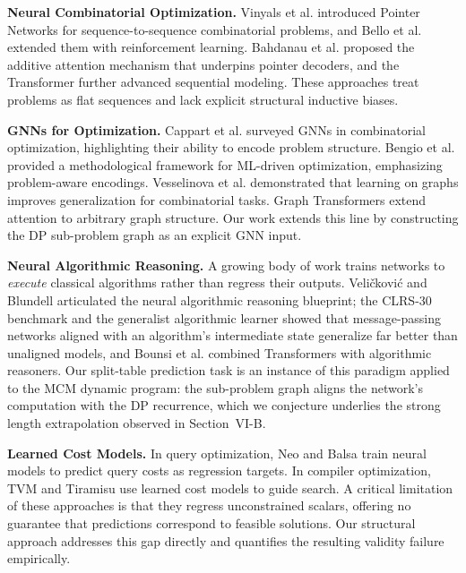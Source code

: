 \documentclass[conference]{IEEEtran}
\begin{document}
\textbf{Neural Combinatorial Optimization.} Vinyals et al. \cite{vinyals2015}
introduced Pointer Networks for sequence-to-sequence combinatorial problems,
and Bello et al. \cite{bello2017} extended them with reinforcement learning.
Bahdanau et al. \cite{bahdanau2015} proposed the additive attention mechanism
that underpins pointer decoders, and the Transformer \cite{vaswani2017} further
advanced sequential modeling. These approaches treat problems as flat sequences
and lack explicit structural inductive biases.

\textbf{GNNs for Optimization.} Cappart et al. \cite{cappart2021} surveyed GNNs
in combinatorial optimization, highlighting their ability to encode problem
structure. Bengio et al. \cite{bengio2021} provided a methodological framework
for ML-driven optimization, emphasizing problem-aware encodings. Vesselinova et
al. \cite{vesselinova2020} demonstrated that learning on graphs improves
generalization for combinatorial tasks. Graph Transformers
\cite{rampasek2022gps,muller2023gt} extend attention to arbitrary graph
structure. Our work extends this line by constructing the DP sub-problem graph
as an explicit GNN input.

\textbf{Neural Algorithmic Reasoning.} A growing body of work trains networks
to \emph{execute} classical algorithms rather than regress their outputs.
Veli\v{c}kovi\'c and Blundell \cite{velickovic2021nar} articulated the neural
algorithmic reasoning blueprint; the CLRS-30 benchmark
\cite{velickovic2022clrs} and the generalist algorithmic learner
\cite{ibarz2022generalist} showed that message-passing networks aligned with an
algorithm's intermediate state generalize far better than unaligned models, and
Bounsi et al. \cite{bounsi2024transformers} combined Transformers with
algorithmic reasoners. Our split-table prediction task is an instance of this
paradigm applied to the MCM dynamic program: the sub-problem graph aligns the
network's computation with the DP recurrence, which we conjecture underlies the
strong length extrapolation observed in Section~VI-B.

\textbf{Learned Cost Models.} In query optimization, Neo \cite{neo2019} and
Balsa \cite{balsa2022} train neural models to predict query costs as regression
targets. In compiler optimization, TVM \cite{tvm2018} and Tiramisu
\cite{tiramisu2021} use learned cost models to guide search. A critical
limitation of these approaches is that they regress unconstrained scalars,
offering no guarantee that predictions correspond to feasible solutions. Our
structural approach addresses this gap directly and quantifies the resulting
validity failure empirically.
\end{document}
